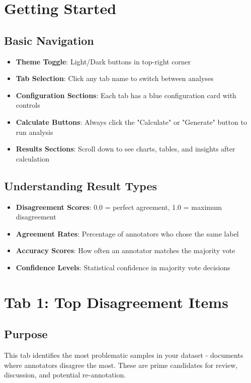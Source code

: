 \documentclass[11pt]{article}
\begin{document}
\section{Getting Started}

\subsection{Basic Navigation}
\begin{itemize}
\item \textbf{Theme Toggle}: Light/Dark buttons in top-right corner
\item \textbf{Tab Selection}: Click any tab name to switch between analyses
\item \textbf{Configuration Sections}: Each tab has a blue configuration card with controls
\item \textbf{Calculate Buttons}: Always click the "Calculate" or "Generate" button to run analysis
\item \textbf{Results Sections}: Scroll down to see charts, tables, and insights after calculation
\end{itemize}

\subsection{Understanding Result Types}
\begin{itemize}
\item \textbf{Disagreement Scores}: 0.0 = perfect agreement, 1.0 = maximum disagreement
\item \textbf{Agreement Rates}: Percentage of annotators who chose the same label
\item \textbf{Accuracy Scores}: How often an annotator matches the majority vote
\item \textbf{Confidence Levels}: Statistical confidence in majority vote decisions
\end{itemize}

\section{Tab 1: Top Disagreement Items}

\subsection{Purpose}
This tab identifies the most problematic samples in your dataset - documents where annotators disagree the most. These are prime candidates for review, discussion, and potential re-annotation.
\end{document}
